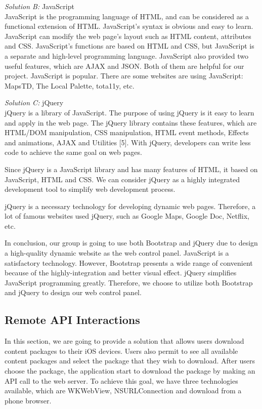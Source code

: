 \documentclass[letterpaper, 10pt,titlepage]{article}
\begin{document}
\textit{Solution B:} JavaScript\\
JavaScript is the programming language of HTML, and can be considered as a functional extension of HTML. JavaScript’s syntax is obvious and easy to learn. JavaScript can modify the web page’s layout such as HTML content, attributes and CSS. JavaScript’s functions are based on HTML and CSS, but JavaScript is a separate and high-level programming language. JavaScript also provided two useful features, which are AJAX and JSON. Both of them are helpful for our project. JavaScript is popular. There are some websites are using JavaScript: MapsTD, The Local Palette, tota11y, etc.


\textit{Solution C:} jQuery\\
jQuery is a library of JavaScript. The purpose of using jQuery is it easy to learn and apply in the web page. The jQuery library contains these features, which are HTML/DOM manipulation, CSS manipulation, HTML event methods, Effects and animations, AJAX and Utilities [5]. With jQuery, developers can write less code to achieve the same goal on web pages. 


Since jQuery is a JavaScript library and has many features of HTML, it based on JavaScript, HTML and CSS. We can consider jQuery as a highly integrated development tool to simplify web development process.


jQuery is a necessary technology for developing dynamic web pages. Therefore, a lot of famous websites used jQuery, such as Google Maps, Google Doc, Netflix, etc. 


In conclusion, our group is going to use both Bootstrap and jQuery due to design a high-quality dynamic website as the web control panel. JavaScript is a satisfactory technology. However, Bootstrap presents a wide range of convenient because of the highly-integration and better visual effect. jQuery simplifies JavaScript programming greatly. Therefore, we choose to utilize both Bootstrap and jQuery to design our web control panel.


\subsection{Remote API Interactions}
In this section, we are going to provide a solution that allows users download content packages to their iOS devices. Users also permit to see all available content packages and select the package that they wish to download. After users choose the package, the application start to download the package by making an API call to the web server. To achieve this goal, we have three technologies available, which are WKWebView, NSURLConnection and download from a phone browser.
\end{document}
